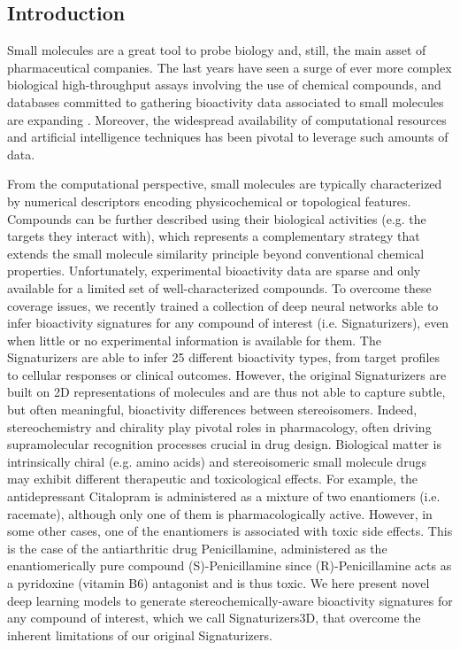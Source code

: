 \subsection{Introduction}


Small molecules are a great tool to probe biology and, still, the main asset of pharmaceutical companies. The last years have seen a surge of ever more complex biological high-throughput assays involving the use of chemical compounds, and databases committed to gathering bioactivity data associated to small molecules are expanding \cite{zdrazil_chembl_2024, kim_pubchem_2023}. Moreover, the widespread availability of computational resources\cite{tetko_bigchem_2016} and artificial intelligence techniques has been pivotal to leverage such amounts of data\cite{von_lilienfeld_retrospective_2020}. 

From the computational perspective, small molecules are typically characterized by numerical descriptors encoding physicochemical or topological features\cite{fernandez-torras_connecting_2022}. Compounds can be further described using their biological activities (e.g. the targets they interact with), which represents a complementary strategy that extends the small molecule similarity principle beyond conventional chemical properties\cite{duran-frigola_extending_2020}. Unfortunately, experimental bioactivity data are sparse and only available for a limited set of well-characterized compounds. To overcome these coverage issues, we recently trained a collection of deep neural networks able to infer bioactivity signatures for any compound of interest (i.e. Signaturizers), even when little or no experimental information is available for them\cite{bertoni_bioactivity_2021}. The Signaturizers are able to infer 25 different bioactivity types, from target profiles to cellular responses or clinical outcomes. However, the original Signaturizers are built on 2D representations of molecules and are thus not able to capture subtle, but often meaningful, bioactivity differences between stereoisomers. Indeed, stereochemistry and chirality play pivotal roles in pharmacology\cite{scott_stereochemical_2022, h_brooks_significance_2011}, often driving supramolecular recognition processes crucial in drug design. Biological matter is intrinsically chiral\cite{inaki_cell_2016} (e.g. amino acids) and stereoisomeric small molecule drugs may exhibit different therapeutic and toxicological effects\cite{mcconathy_stereochemistry_2003, smith_chiral_2009}. For example, the antidepressant Citalopram is administered as a mixture of two enantiomers (i.e. racemate), although only one of them is pharmacologically active\cite{snchez_escitalopram_2004, sanchez_pharmacology_2006}. However, in some other cases, one of the enantiomers is associated with toxic side effects. This is the case of the antiarthritic drug Penicillamine, administered as the enantiomerically pure compound (S)-Penicillamine since (R)-Penicillamine acts as a pyridoxine (vitamin B6) antagonist and is thus toxic\cite{smith_chiral_2009, williams_enantiomers_1990}. We here present novel deep learning models to generate stereochemically-aware bioactivity signatures for any compound of interest, which we call Signaturizers3D, that overcome the inherent limitations of our original Signaturizers. 

